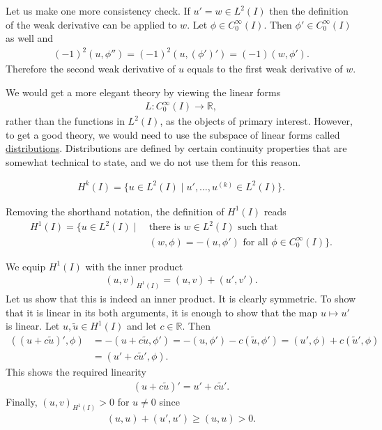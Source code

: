 \documentclass[12pt,oneside,final]{amsart}
\def\R{\mathbb R}
\begin{document}
Let us make one more consistency check. If $u' = w \in L^2(I)$
then the definition of the weak derivative can be applied to $w$.
Let $\phi \in C_0^\infty(I)$. Then $\phi' \in C_0^\infty(I)$ as well and 
    \begin{align*}
(-1)^2 (u, \phi'') = (-1)^2 (u, (\phi')') = (-1) (w, \phi').
    \end{align*}
Therefore the second weak derivative of $u$ equals to the first weak derivative of $w$.

We would get a more elegant theory by viewing the linear forms 
    \begin{align*}
L : C_0^\infty(I) \to \R,
    \end{align*}
rather than the functions in $L^2(I)$, as the objects of primary interest. However, to get a good theory, we would need to use the subspace of linear forms called 
\href{https://en.wikipedia.org/wiki/Distribution_(mathematics)}{distributions}. Distributions are defined by certain continuity properties that are somewhat technical to state, and we do not use them for this reason.  

\begin{definition}
    \begin{align*}
H^k(I) = \{ u \in L^2(I) \mid u', \dots, u^{(k)} \in L^2(I)\}.
    \end{align*}
\end{definition}

Removing the shorthand notation, the definition of $H^1(I)$ reads
    \begin{align*}
H^1(I) = \{ u \in L^2(I) \mid
\  
&\text{there is $w \in L^2(I)$ such that}
\\
&\text{$(w, \phi) = -(u, \phi')$ for all $\phi \in C_0^\infty(I)$}
\}.
    \end{align*}

We equip $H^1(I)$ with the inner product
    \begin{align*}
(u,v)_{H^1(I)} = (u,v) + (u', v').
    \end{align*}
Let us show that this is indeed an inner product.
It is clearly symmetric. 
To show that it is linear in its both arguments, it is enough to show that the map $u \mapsto u'$ is linear. Let $u, \tilde u \in H^1(I)$ and let $c \in \R$. Then 
    \begin{align*}
((u + c \tilde u)', \phi) 
&= 
-(u + c \tilde u, \phi')
= 
-(u, \phi') - c (\tilde u, \phi')
= 
(u', \phi) + c(\tilde u', \phi)
\\&=
(u' + c \tilde u', \phi).
    \end{align*}
This shows the required linearity 
    \begin{align}\label{eq_weakd_lin}
(u + c \tilde u)' = u' + c \tilde u'.
    \end{align}
Finally, $(u,v)_{H^1(I)}> 0$ for $u \ne 0$ since 
    \begin{align*}
(u,u) + (u', u') \ge (u, u) > 0.
    \end{align*}
\end{document}
